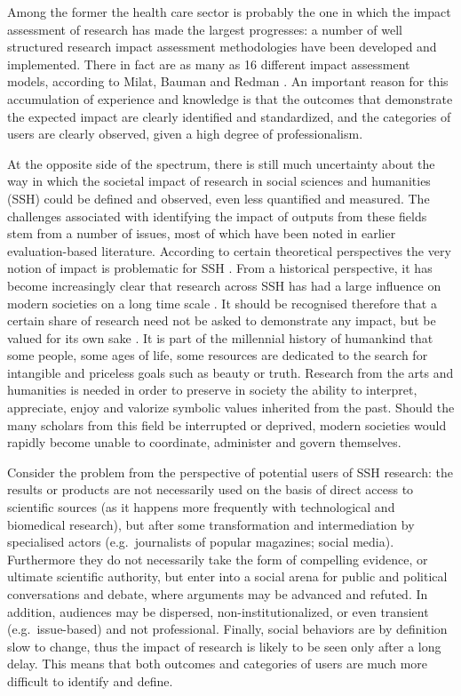 \documentclass[b5paper,]{book}
\theoremstyle{definition}
\theoremstyle{definition}
\theoremstyle{definition}
\theoremstyle{remark}
\begin{document}
Among the former the health care sector is probably the one in which the
impact assessment of research has made the largest progresses: a number
of well structured research impact assessment methodologies have been
developed and implemented. There in fact are as many as 16 different
impact assessment models, according to Milat, Bauman and Redman
\citep{milat2015narrative}. An important reason for this accumulation of
experience and knowledge is that the outcomes that demonstrate the
expected impact are clearly identified and standardized, and the
categories of users are clearly observed, given a high degree of
professionalism.

At the opposite side of the spectrum, there is still much uncertainty
about the way in which the societal impact of research in social
sciences and humanities (SSH) could be defined and observed, even less
quantified and measured. The challenges associated with identifying the
impact of outputs from these fields stem from a number of issues, most
of which have been noted in earlier evaluation-based literature.
According to certain theoretical perspectives the very notion of impact
is problematic for SSH \citep{blasi2018ssh}. From a historical
perspective, it has become increasingly clear that research across SSH
has had a large influence on modern societies on a long time scale
\citep{bod2013new}. It should be recognised therefore that a certain
share of research need not be asked to demonstrate any impact, but be
valued for its own sake \citep{small2013value}. It is part of the
millennial history of humankind that some people, some ages of life,
some resources are dedicated to the search for intangible and priceless
goals such as beauty or truth. Research from the arts and humanities is
needed in order to preserve in society the ability to interpret,
appreciate, enjoy and valorize symbolic values inherited from the past.
Should the many scholars from this field be interrupted or deprived,
modern societies would rapidly become unable to coordinate, administer
and govern themselves.

Consider the problem from the perspective of potential users of SSH
research: the results or products are not necessarily used on the basis
of direct access to scientific sources (as it happens more frequently
with technological and biomedical research), but after some
transformation and intermediation by specialised actors
(e.g.~journalists of popular magazines; social media). Furthermore they
do not necessarily take the form of compelling evidence, or ultimate
scientific authority, but enter into a social arena for public and
political conversations and debate, where arguments may be advanced and
refuted. In addition, audiences may be dispersed, non-institutionalized,
or even transient (e.g.~issue-based) and not professional. Finally,
social behaviors are by definition slow to change, thus the impact of
research is likely to be seen only after a long delay. This means that
both outcomes and categories of users are much more difficult to
identify and define.
\end{document}
